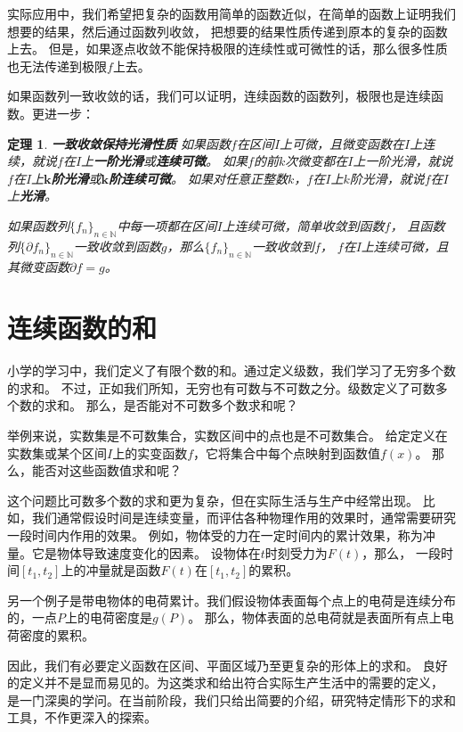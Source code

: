 \documentclass[12pt,UTF8]{ctexbook}
\newtheorem{tm}{定理}[section]
\begin{document}
实际应用中，我们希望把复杂的函数用简单的函数近似，在简单的函数上证明我们想要的结果，然后通过函数列收敛，
把想要的结果性质传递到原本的复杂的函数上去。
但是，如果逐点收敛不能保持极限的连续性或可微性的话，那么很多性质也无法传递到极限$f$上去。

如果函数列一致收敛的话，我们可以证明，连续函数的函数列，极限也是连续函数。更进一步：

\begin{tm}{\textbf{一致收敛保持光滑性质}}
    如果函数$f$在区间$I$上可微，且微变函数在$I$上连续，就说$f$在$I$上\textbf{一阶光滑}或\textbf{连续可微}。
    如果$f$的前$k$次微变都在$I$上一阶光滑，就说$f$在$I$上$\boldsymbol{k}$\textbf{阶光滑}或$\boldsymbol{k}$\textbf{阶连续可微}。
    如果对任意正整数$k$，$f$在$I$上$k$阶光滑，就说$f$在$I$上\textbf{光滑}。

    如果函数列$\{f_n\}_{n\in\mathbb{N}}$中每一项都在区间$I$上连续可微，简单收敛到函数$f$，
    且函数列$\{\partial f_n\}_{n\in\mathbb{N}}$一致收敛到函数$g$，那么$\{f_n\}_{n\in\mathbb{N}}$一致收敛到$f$，
    $f$在$I$上连续可微，且其微变函数$\partial f = g$。
\end{tm}

\chapter{连续函数的和}
小学的学习中，我们定义了有限个数的和。通过定义级数，我们学习了无穷多个数的求和。
不过，正如我们所知，无穷也有可数与不可数之分。级数定义了可数多个数的求和。
那么，是否能对不可数多个数求和呢？

举例来说，实数集是不可数集合，实数区间中的点也是不可数集合。
给定定义在实数集或某个区间$I$上的实变函数$f$，它将集合中每个点映射到函数值$f(x)$。
那么，能否对这些函数值求和呢？

这个问题比可数多个数的求和更为复杂，但在实际生活与生产中经常出现。
比如，我们通常假设时间是连续变量，而评估各种物理作用的效果时，通常需要研究一段时间内作用的效果。
例如，物体受的力在一定时间内的累计效果，称为冲量。它是物体导致速度变化的因素。
设物体在$t$时刻受力为$F(t)$，那么，
一段时间$[t_1, t_2]$上的冲量就是函数$F(t)$在$[t_1, t_2]$的累积。

另一个例子是带电物体的电荷累计。我们假设物体表面每个点上的电荷是连续分布的，一点$P$上的电荷密度是$g(P)$。
那么，物体表面的总电荷就是表面所有点上电荷密度的累积。

因此，我们有必要定义函数在区间、平面区域乃至更复杂的形体上的求和。
良好的定义并不是显而易见的。为这类求和给出符合实际生产生活中的需要的定义，
是一门深奥的学问。在当前阶段，我们只给出简要的介绍，研究特定情形下的求和工具，不作更深入的探索。
\end{document}
